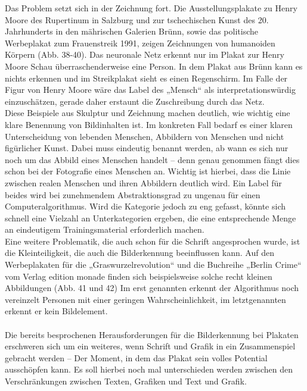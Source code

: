 \documentclass[a4paper,12pt,ngerman]{article}
\begin{document}
Das Problem setzt sich in der Zeichnung fort. Die Ausstellungsplakate zu Henry Moore des Rupertinum in Salzburg und zur tschechischen Kunst des 20. Jahrhunderts in den mährischen Galerien Brünn, sowie das politische Werbeplakat zum Frauenstreik 1991, zeigen Zeichnungen von humanoiden Körpern (Abb. 38-40). Das neuronale Netz erkennt nur im Plakat zur Henry Moore Schau überraschenderweise eine Person. In dem Plakat aus Brünn kann es nichts erkennen und im Streikplakat sieht es einen Regenschirm. Im Falle der Figur von Henry Moore wäre das Label des „Mensch“ als interpretationswürdig einzuschätzen, gerade daher erstaunt die Zuschreibung durch das Netz. \\
Diese Beispiele aus Skulptur und Zeichnung machen deutlich, wie wichtig eine klare Benennung von Bildinhalten ist. Im konkreten Fall bedarf es einer klaren Unterscheidung von lebenden Menschen, Abbildern von Menschen und nicht figürlicher Kunst. Dabei muss eindeutig benannt werden, ab wann es sich nur noch um das Abbild eines Menschen handelt – denn genau genommen fängt dies schon bei der Fotografie eines Menschen an. Wichtig ist hierbei, dass die Linie zwischen realen Menschen und ihren Abbildern deutlich wird. Ein Label für beides wird bei zunehmendem Abstraktionsgrad zu ungenau für einen Computeralgorithmus. Wird die Kategorie jedoch zu eng gefasst, könnte sich schnell eine Vielzahl an Unterkategorien ergeben, die eine entsprechende Menge an eindeutigem Trainingsmaterial erforderlich machen. \\
Eine weitere Problematik, die auch schon für die Schrift angesprochen wurde, ist die Kleinteiligkeit, die auch die Bilderkennung beeinflussen kann. Auf den Werbeplakaten für die „Graswurzelrevolution“ und die Buchreihe „Berlin Crime“ vom Verlag edition monade finden sich beispielsweise solche recht kleinen Abbildungen (Abb. 41 und 42) Im erst genannten erkennt der Algorithmus noch vereinzelt Personen mit einer geringen Wahrscheinlichkeit, im letztgenannten erkennt er kein Bildelement. \\
\\
Die bereits besprochenen Herausforderungen für die Bilderkennung bei Plakaten erschweren sich um ein weiteres, wenn Schrift und Grafik in ein Zusammenspiel gebracht werden – Der Moment, in dem das Plakat sein volles Potential ausschöpfen kann. Es soll hierbei noch mal unterschieden werden zwischen den Verschränkungen zwischen Texten, Grafiken und Text und Grafik. \\
\end{document}
